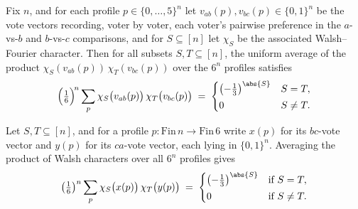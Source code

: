 \begin{lemma}
\label{ArrowTheorem.profile_inner_product_kernel}
\leanok
{}
Fix $n$, and for each profile $p \in \{0,\dots,5\}^n$ let $v_{ab}(p), v_{bc}(p) \in
\{0,1\}^n$ be the vote vectors recording, voter by voter, each voter's pairwise
preference in the $a$-vs-$b$ and $b$-vs-$c$ comparisons, and for $S \subseteq [n]$ let
$\chi_S$ be the associated Walsh–Fourier character. Then for all subsets $S, T \subseteq
[n]$, the uniform average of the product $\chi_S(v_{ab}(p))\,\chi_T(v_{bc}(p))$ over the
$6^n$ profiles satisfies
\[
  \Bigl(\tfrac{1}{6}\Bigr)^{\!n}\sum_{p}
    \chi_S\bigl(v_{ab}(p)\bigr)\,\chi_T\bigl(v_{bc}(p)\bigr)
  \;=\;
\begin{cases} \left(-\tfrac{1}{3}\right)^{\abs{S}} & S = T,\\[2pt] 0 & S \ne T.
\end{cases}
\]
\end{lemma}

\begin{lemma}
\label{ArrowTheorem.profile_kernel_bcca}
\leanok
{}
Let $S, T \subseteq [n]$, and for a profile $p \colon \mathrm{Fin}\,n \to
\mathrm{Fin}\,6$ write $x(p)$ for its $bc$-vote vector and $y(p)$ for its $ca$-vote
vector, each lying in $\{0,1\}^n$. Averaging the product of Walsh characters over all
$6^n$ profiles gives
\[
  \left(\tfrac{1}{6}\right)^{n} \sum_{p} \chi_S\bigl(x(p)\bigr)\,\chi_T\bigl(y(p)\bigr)
  \;=\;
\begin{cases} \left(-\tfrac{1}{3}\right)^{\abs{S}} & \text{if } S = T,\\[2pt] 0 &
\text{if } S \ne T. \end{cases}
\]
\end{lemma}

